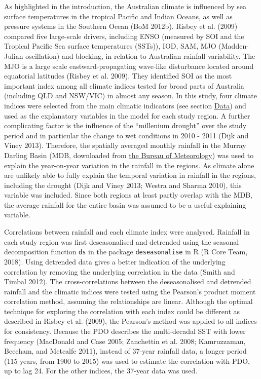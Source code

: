 \documentclass[fleqn,10pt,lineno]{wlpeerj} %
\begin{document}
As highlighted in the introduction, the Australian climate is influenced
by sea surface temperatures in the tropical Pacific and Indian Oceans,
as well as pressure systems in the Southern Ocean (BoM 2012b). Risbey et
al. (2009) compared five large-scale drivers, including ENSO (measured
by SOI and the Tropical Pacific Sea surface temperatures (SSTs)), IOD,
SAM, MJO (Madden-Julian oscillation) and blocking, in relation to
Australian rainfall variability. The MJO is a large scale
eastward-propagating wave-like disturbance located around equatorial
latitudes (Risbey et al. 2009). They identified SOI as the most
important index among all climate indices tested for broad parts of
Australia (including QLD and NSW/VIC) in almost any season. In this
study, four climate indices were selected from the main climatic
indicators (see section \protect\hyperlink{Data}{Data}) and used as the
explanatory variables in the model for each study region. A further
complicating factor is the influence of the ``millenium drought'' over
the study period and in particular the change to wet conditions in 2010
- 2011 (Dijk and Viney 2013). Therefore, the spatially averaged monthly
rainfall in the Murray Darling Basin (MDB, downloaded from
\href{http://www.bom.gov.au/web01/ncc/www/cli_chg/timeseries/rain/allmonths/mdb/latest.txt}{the
Bureau of Meteorology}) was used to explain the year-on-year variation
in the rainfall in the regions. As climate alone are unlikely able to
fully explain the temporal variation in rainfall in the regions,
including the drought (Dijk and Viney 2013; Westra and Sharma 2010),
this variable was included. Since both regions at least partly overlap
with the MDB, the average rainfall for the entire basin was assumed to
be a useful explaining variable.

Correlations between rainfall and each climate index were analysed.
Rainfall in each study region was first deseasonalised and detrended
using the seasonal decomposition function \texttt{ds} in the package
\texttt{deseasonalise} in R (R Core Team, 2018). Using detrended data
gives a better indication of the underlying correlation by removing the
underlying correlation in the data (Smith and Timbal 2012). The
cross-correlations between the deseasonalised and detrended rainfall and
the climatic indices were tested using the Pearson's product moment
correlation method, assuming the relationships are linear. Although the
optimal technique for exploring the correlation with each index could be
different as described in Risbey et al. (2009), the Pearson's method was
applied to all indices for consistency. Because the PDO describes the
multi-decadal SST with lower frequency (MacDonald and Case 2005;
Zanchettin et al. 2008; Kamruzzaman, Beecham, and Metcalfe 2011),
instead of 37-year rainfall data, a longer period (115 years, from 1900
to 2015) was used to estimate the correlation with PDO, up to lag 24.
For the other indices, the 37-year data was used.
\end{document}
